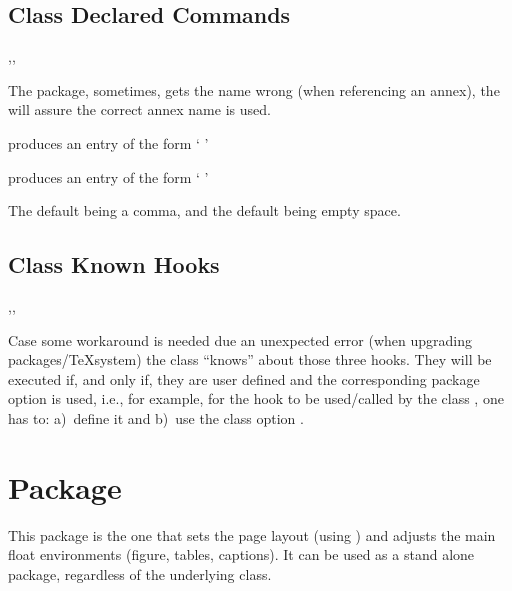 \documentclass[article,nofontwarning,nogeometry,english,tocdepth=3,secdepth=3]{ufrgscca} %
\begin{document}
\subsection{Class Declared Commands}
\begin{codedescribe}{\autonameref,\annexref,\autoannexref}
	\begin{codesyntax}%
	\end{codesyntax}
The  package, sometimes, gets the \tsmacro{\autoref}{} name wrong (when referencing an annex), the  will assure the correct annex name is used.

 produces an entry of the form `   '

 produces an entry of the form `   '

The default  being a comma, and the default  being empty space.

\end{codedescribe}

\subsection{Class Known Hooks}
\begin{codedescribe}{\miktexHack,\overleafHack,\livetexHack}
    \begin{codesyntax}%
        \tsmacro{\miktexHack}{}
        \tsmacro{\overleafHack}{}
        \tsmacro{\livetexHack}{}
    \end{codesyntax}
    Case some workaround is needed due an unexpected error (when upgrading packages/\TeX system) the class “knows” about those three hooks.
    They will be executed if, and only if, they are user defined and the corresponding package option is used, i.e., for example, for the hook \tsmacro{\miktexHack}{} to be used/called by the class , one has to: a)~define it and b)~use the class option .
\end{codedescribe}


\section{ Package}
This package is the one that sets the page layout (using ) and adjusts the main float environments (figure, tables, captions).
It can be used as a stand alone package, regardless of the underlying class.
\end{document}
